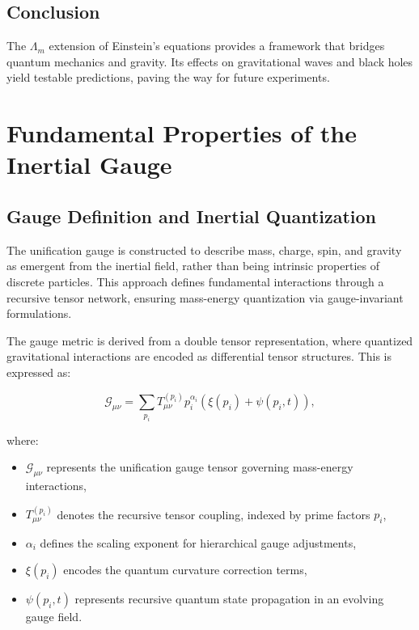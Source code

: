 \documentclass{article}
\theoremstyle{plain}
\begin{document}
\subsection{Conclusion}
The $\Lambda_m$ extension of Einstein’s equations provides a framework that bridges quantum mechanics and gravity. Its effects on gravitational waves and black holes yield testable predictions, paving the way for future experiments.
\section{Fundamental Properties of the Inertial Gauge}

\subsection{Gauge Definition and Inertial Quantization}

The unification gauge is constructed to describe mass, charge, spin, and gravity as emergent from the inertial field, rather than being intrinsic properties of discrete particles. This approach defines fundamental interactions through a recursive tensor network, ensuring mass-energy quantization via gauge-invariant formulations.

The gauge metric is derived from a double tensor representation, where quantized gravitational interactions are encoded as differential tensor structures. This is expressed as:

\begin{equation}
    \mathcal{G}_{\mu\nu} = \sum_{p_i} T_{\mu\nu}^{(p_i)} p_i^{\alpha_i} \left( \xi(p_i) + \psi(p_i, t) \right),
\end{equation}

where:
\begin{itemize}
    \item $\mathcal{G}_{\mu\nu}$ represents the unification gauge tensor governing mass-energy interactions,
    \item $T_{\mu\nu}^{(p_i)}$ denotes the recursive tensor coupling, indexed by prime factors $p_i$,
    \item $\alpha_i$ defines the scaling exponent for hierarchical gauge adjustments,
    \item $\xi(p_i)$ encodes the quantum curvature correction terms,
    \item $\psi(p_i, t)$ represents recursive quantum state propagation in an evolving gauge field.
\end{itemize}
\end{document}
